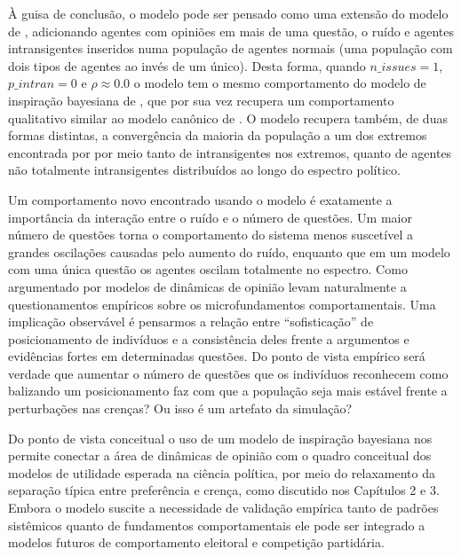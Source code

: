     À guisa de conclusão, o modelo pode ser pensado como uma extensão do modelo
    de , adicionando agentes com opiniões em
    mais de uma questão, o ruído e agentes intransigentes inseridos numa
    população de agentes normais (uma população com dois tipos de agentes ao
    invés de um único). Desta forma, quando \(n\_issues = 1\), \(p\_intran = 0\)
    e \(\rho \approx 0.0\) o modelo tem o mesmo comportamento do modelo de inspiração
    bayesiana de , que por sua vez recupera um
    comportamento qualitativo similar ao modelo canônico de
    . O modelo recupera também, de
    duas formas distintas, a convergência da maioria da população a um dos
    extremos encontrada por  por meio tanto de
    intransigentes nos extremos, quanto de agentes não totalmente intransigentes
    distribuídos ao longo do espectro político.

    Um comportamento novo encontrado usando o modelo é exatamente a importância
    da interação entre o ruído e o número de questões. Um maior número de
    questões torna o comportamento do sistema menos suscetível a grandes
    oscilações causadas pelo aumento do ruído, enquanto que em um modelo com uma
    única questão os agentes oscilam totalmente no espectro. Como argumentado
    por  modelos de dinâmicas de opinião levam
    naturalmente a questionamentos empíricos sobre os microfundamentos
    comportamentais. Uma implicação observável é pensarmos a relação entre
    ``sofisticação'' de posicionamento de indivíduos e a consistência deles
    frente a argumentos e evidências fortes em determinadas questões. Do ponto
    de vista empírico será verdade que aumentar o número de questões que os
    indivíduos reconhecem como balizando um posicionamento faz com que a
    população seja mais estável frente a perturbações nas crenças? Ou isso é um
    artefato da simulação?

    Do ponto de vista conceitual o uso de um modelo de inspiração bayesiana nos
    permite conectar a área de dinâmicas de opinião com o quadro conceitual dos
    modelos de utilidade esperada na ciência política, por meio do relaxamento
    da separação típica entre preferência e crença, como discutido nos Capítulos
    2 e 3. Embora o modelo suscite a necessidade de validação empírica tanto de
    padrões sistêmicos quanto de fundamentos comportamentais ele pode ser
    integrado a modelos futuros de comportamento eleitoral e competição
    partidária.


    
